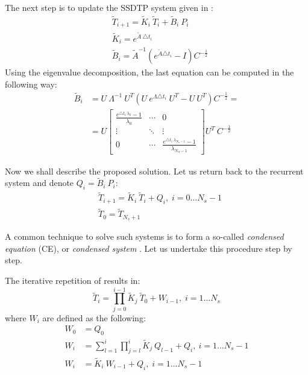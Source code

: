 The next step is to update the SSDTP system given in :
\begin{align}
  & \tilde{T}_{i+1} = \tilde{K}_i \: \tilde{T}_i + \tilde{B}_i \: P_i \label{eq:recurrent-equation} \\
  & \tilde{K}_i = e^{\tilde{A} \: \triangle t_i} \nonumber \\
  & \tilde{B}_i = \tilde{A}^{-1} \left( e^{\tilde{A} \triangle t_i} - I \right) C^{-\frac{1}{2}} \nonumber
\end{align}
Using the eigenvalue decomposition, the last equation can be computed in the following way:
\begin{align*}
  \tilde{B}_i & = U \: \Lambda^{-1} \: U^T \left(U \: e^{\Lambda \triangle t_i} \: U^T - U \: U^T \right) C^{-\frac{1}{2}} = \\
      & = U \left[
        \begin{array}{ccc}
          \frac{e^{\triangle t_i \: \lambda_0} - 1}{\lambda_0} & \cdots & 0 \\
          \vdots & \ddots & \vdots \\
          0 & \cdots & \frac{e^{\triangle t_i \: \lambda_{N_n - 1}} - 1}{\lambda_{N_n - 1}}
        \end{array}
      \right] U^T \: C^{-\frac{1}{2}}
\end{align*}

Now we shall describe the proposed solution. Let us return back to the recurrent system and denote $Q_i = \tilde{B}_i \: P_i$:
\begin{align}
  & \tilde{T}_{i + 1} = \tilde{K}_i \: \tilde{T}_i + Q_i, \; i = 0 \dots N_s - 1 \label{eq:ce-recurrent} \\
  & \tilde{T}_0 = \tilde{T}_{N_s + 1} \nonumber
\end{align}

A common technique to solve such systems is to form a so-called \emph{condensed equation} (CE), or \emph{condensed system} \cite{stoer2002}. Let us undertake this procedure step by step.

The iterative repetition of  results in:
\begin{equation} \label{eq:y-recurrent}
  \tilde{T}_i = \prod_{j = 0}^{i - 1} \tilde{K}_j \: \tilde{T}_0 + W_{i - 1}, \; i = 1 \dots N_s
\end{equation}
where $W_i$ are defined as the following:
\begin{align}
  W_0 & = Q_0 \nonumber \\
  W_i & = \sum_{l = 1}^i \prod_{j = l}^i \tilde{K}_j \: Q_{l - 1} + Q_i, \: i = 1 \dots N_s - 1 \nonumber \\
  W_i & = \tilde{K}_i \: W_{i - 1} + Q_i, \; i = 1 \dots N_s - 1 \label{eq:p-recurrent}
\end{align}

